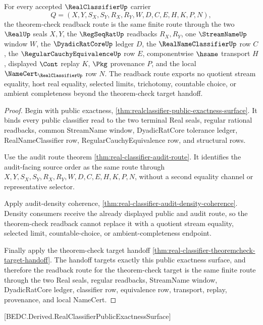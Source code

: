 \begin{theorem}
\label{thm:real-classifier-theoremcheck-readback-route}
For every accepted $\RealClassifierUp$ carrier
$$
Q=(X,Y,S_X,S_Y,R_X,R_Y,W,D,C,E,H,K,P,N),
$$
the theorem-check readback route is the same finite route through the two $\RealUp$ seals $X,Y$, the $\RegSeqRatUp$ readbacks $R_X,R_Y$, one $\StreamNameUp$ window $W$, the $\DyadicRatCoreUp$ ledger $D$, the $\RealNameClassifierUp$ row $C$, the $\RegularCauchyEquivalenceUp$ row $E$, componentwise $\hsame$ transport $H$, displayed $\Cont$ replay $K$, $\Pkg$ provenance $P$, and the local $\NameCert_{\RealClassifierUp}$ row $N$. The readback route exports no quotient stream equality, host real equality, selected limits, trichotomy, countable choice, or ambient completeness beyond the theorem-check target handoff.
\end{theorem}
\begin{proof}
Begin with public exactness, \autoref{thm:realclassifier-public-exactness-surface}. It binds every public classifier read to the two terminal Real seals, regular rational readbacks, common StreamName window, DyadicRatCore tolerance ledger, RealNameClassifier row, RegularCauchyEquivalence row, and structural rows.

Use the audit route theorem \autoref{thm:real-classifier-audit-route}. It identifies the audit-facing source order as the same route through $X,Y,S_X,S_Y,R_X,R_Y,W,D,C,E,H,K,P,N$, without a second equality channel or representative selector.

Apply audit-density coherence, \autoref{thm:real-classifier-audit-density-coherence}. Density consumers receive the already displayed public and audit route, so the theorem-check readback cannot replace it with a quotient stream equality, selected limit, countable-choice, or ambient-completeness endpoint.

Finally apply the theorem-check target handoff \autoref{thm:real-classifier-theoremcheck-target-handoff}. The handoff targets exactly this public exactness surface, and therefore the readback route for the theorem-check target is the same finite route through the two Real seals, regular readbacks, StreamName window, DyadicRatCore ledger, classifier row, equivalence row, transport, replay, provenance, and local NameCert.
\end{proof}

[BEDC.Derived.RealClassifierPublicExactnessSurface]

